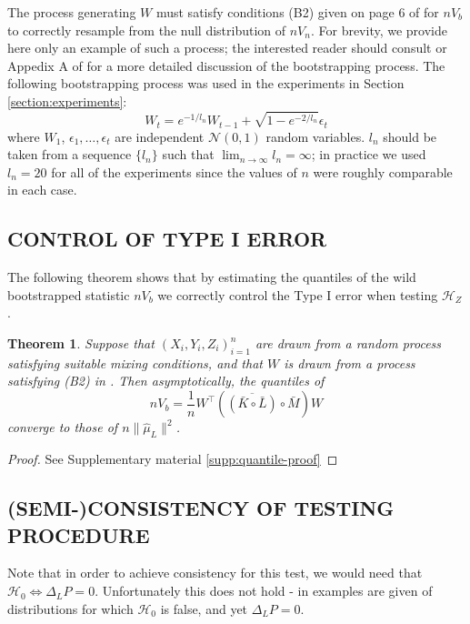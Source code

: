 \documentclass[]{article}
\newtheorem{theorem}{Theorem}
\begin{document}
The process generating $W$ must satisfy conditions (B2) given on page 6 of \citet{leucht2013dependent} for $nV_b$ to correctly resample from the null distribution of $nV_n$. For brevity, we provide here only an example of such a process; the interested reader should consult \citet{leucht2013dependent} or Appedix A of \citet{chwialkowski2014wild} for a more detailed discussion of the bootstrapping process. The following bootstrapping process was used in the experiments in Section \ref{section:experiments}:
\begin{equation}\label{equation:bootstrap}
W_t = e^{-1/l_n}W_{t-1} + \sqrt{1 - e^{-2/l_n}}\epsilon_t 
\end{equation}
where $W_1$, $\epsilon_1, \ldots, \epsilon_t$ are independent $\mathcal{N}(0,1)$ random variables. $l_n$ should be taken from a sequence $\{l_n\}$ such that $\lim_{n\longrightarrow\infty}l_n = \infty$; in practice we used $l_n=20$ for all of the experiments since the values of $n$ were roughly comparable in each case.
\subsection{CONTROL OF TYPE I ERROR}

The following theorem shows that by estimating the quantiles of the wild bootstrapped statistic $nV_b$ we correctly control the Type I error when testing $\mathcal{H}_Z$.

\begin{theorem}\label{theorem:quantiles-converge}
Suppose that $(X_i,Y_i,Z_i)_{i=1}^n$ are drawn from a random process satisfying suitable mixing conditions, and that $W$ is drawn from a process satisfying (B2) in \citet{leucht2013dependent}. Then asymptotically, the quantiles of
\[nV_b = \frac{1}{n}W^\intercal\left( \overline{\left( \bar{K} \circ \bar{L}\right) }\circ \bar{M} \right)W\]
converge to those of $ n\| \hat \mu_L\|^2$. 
\end{theorem}

\begin{proof}
See Supplementary material \ref{supp:quantile-proof}
\end{proof}




\subsection{(SEMI-)CONSISTENCY OF TESTING PROCEDURE}

Note that in order to achieve consistency for this test, we would need that $\mathcal{H}_0 \iff \Delta_LP = 0$. Unfortunately this does not hold - in \citet{sejdinovic2013kernel} examples are given of distributions for which $\mathcal{H}_0$ is false, and yet $\Delta_LP = 0$. 
\end{document}
